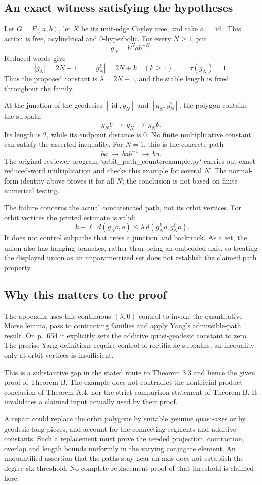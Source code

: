 \documentclass[10pt]{article}
\begin{document}
\subsection*{An exact witness satisfying the hypotheses}
Let \(G=F(a,b)\), let \(X\) be its unit-edge Cayley tree, and take \(o=\operatorname{id}\). This action is free, acylindrical and \(0\)-hyperbolic. For every \(N\ge1\), put \[g_N=b^Na b^{-N}.\] Reduced words give \[|g_N|=2N+1,\qquad
 |g_N^k|=2N+k\quad(k\ge1),\qquad
 \tau(g_N)=1.\] Thus the proposed constant is \(\lambda=2N+1\), and the stable length is fixed throughout the family.\par
At the junction of the geodesics \([\operatorname{id},g_N]\) and \([g_N,g_N^2]\), the polygon contains the subpath \[g_Nb\ \longrightarrow\ g_N\ \longrightarrow\ g_Nb .\] Its length is \(2\), while its endpoint distance is \(0\). No finite multiplicative constant can satisfy the asserted inequality. For \(N=1\), this is the concrete path \[ba\ \longrightarrow\ bab^{-1}\ \longrightarrow\ ba .\] The original reviewer program `orbit\_path\_counterexample.py` carries out exact reduced-word multiplication and checks this example for several \(N\). The normal-form identity above proves it for all \(N\); the conclusion is not based on finite numerical testing.\par
The failure concerns the actual concatenated path, not its orbit vertices. For orbit vertices the printed estimate is valid: \[|k-\ell|\,d(g_No,o)
       \le \lambda\,d(g_N^ko,g_N^\ell o).\] It does not control subpaths that cross a junction and backtrack. As a set, the union also has hanging branches, rather than being an embedded axis, so treating the displayed union as an unparametrized set does not establish the claimed path property.\par
\subsection*{Why this matters to the proof}
The appendix uses this continuous \((\lambda,0)\) control to invoke the quantitative Morse lemma, pass to contracting families and apply Yang’s admissible-path result. On p. 654 it explicitly sets the additive quasi-geodesic constant to zero. The precise Yang definitions require control of rectifiable subpaths; an inequality only at orbit vertices is insufficient.\par
This is a substantive gap in the stated route to Theorem 3.3 and hence the given proof of Theorem B. The example does not contradict the nontrivial-product conclusion of Theorem A.4, nor the strict-comparison statement of Theorem B. It invalidates a claimed input actually used by their proof.\par
A repair could replace the orbit polygons by suitable genuine quasi-axes or by geodesic long pieces, and account for the connecting segments and additive constants. Such a replacement must prove the needed projection, contraction, overlap and length bounds uniformly in the varying conjugate element. An unquantified assertion that the paths stay near an axis does not establish the degree-six threshold. No complete replacement proof of that threshold is claimed here.\par
\end{document}
